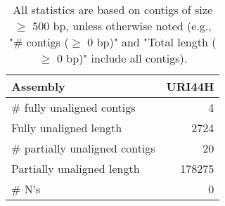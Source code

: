 \documentclass[12pt,a4paper]{article}
\begin{document}
\begin{table}[ht]
\begin{center}
\caption{All statistics are based on contigs of size $\geq$ 500 bp, unless otherwise noted (e.g., "\# contigs ($\geq$ 0 bp)" and "Total length ($\geq$ 0 bp)" include all contigs).}
\begin{tabular}{|l*{1}{|r}|}
\hline
Assembly & URI44H \\ \hline
\# fully unaligned contigs & 4 \\ \hline
Fully unaligned length & 2724 \\ \hline
\# partially unaligned contigs & 20 \\ \hline
Partially unaligned length & 178275 \\ \hline
\# N's & 0 \\ \hline
\end{tabular}
\end{center}
\end{table}
\end{document}
